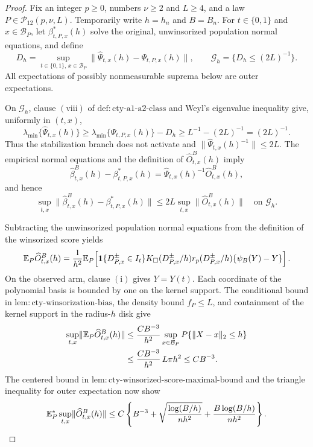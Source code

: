 \documentclass{article}
\begin{document}
\begin{proof}
Fix an integer \(p\geq0\), numbers \(\nu\geq2\) and \(L\geq4\), and a law \(P\in\mathcal P_{12}(p,\nu,L)\).  Temporarily write \(h=h_n\) and \(B=B_n\).  For \(t\in\{0,1\}\) and \(x\in\mathcal B_P\), let \(\beta^*_{t,P,x}(h)\) solve the original, unwinsorized population normal equations, and define
\[
 D_h=\sup_{t\in\{0,1\},\,x\in\mathcal B_P}
 \lVert\widehat\Psi_{t,x}(h)-\Psi_{t,P,x}(h)\rVert,
 \qquad
 \mathcal G_h=\{D_h\leq(2L)^{-1}\}.
\]
All expectations of possibly nonmeasurable suprema below are outer expectations.

On \(\mathcal G_h\), clause \(\mathrm{(viii)}\) of \(\mathrm{def:cty\text{-}a1\text{-}a2\text{-}class}\) and Weyl's eigenvalue inequality give, uniformly in \((t,x)\),
\[
 \lambda_{\min}\{\widehat\Psi_{t,x}(h)\}
 \geq \lambda_{\min}\{\Psi_{t,P,x}(h)\}-D_h
 \geq L^{-1}-(2L)^{-1}=(2L)^{-1}.
\]
Thus the stabilization branch does not activate and \(\lVert\widehat\Psi_{t,x}(h)^{-1}\rVert\leq2L\).  The empirical normal equations and the definition of \(\widehat O^B_{t,x}(h)\) imply
\[
 \widehat\beta^B_{t,x}(h)-\beta^*_{t,P,x}(h)
 =\widehat\Psi_{t,x}(h)^{-1}\widehat O^B_{t,x}(h),
\]
and hence
\[
 \sup_{t,x}\lVert\widehat\beta^B_{t,x}(h)-\beta^*_{t,P,x}(h)\rVert
 \leq 2L\sup_{t,x}\lVert\widehat O^B_{t,x}(h)\rVert
 \quad\text{on }\mathcal G_h.
\]

Subtracting the unwinsorized population normal equations from the definition of the winsorized score yields
\[
 \mathbb E_P\widehat O^B_{t,x}(h)
 ={1\over h^2}\mathbb E_P\!\left[
 \mathbf1\{D^{\pm}_{P,x}\in I_t\}K_\square(D^{\pm}_{P,x}/h)
 r_p(D^{\pm}_{P,x}/h)\{\psi_B(Y)-Y\}
 \right].
\]
On the observed arm, clause \(\mathrm{(i)}\) gives \(Y=Y(t)\).  Each coordinate of the polynomial basis is bounded by one on the kernel support.  The conditional bound in \(\mathrm{lem:cty\text{-}winsorization\text{-}bias}\), the density bound \(f_P\leq L\), and containment of the kernel support in the radius-\(h\) disk give
\[
\begin{split}
 \sup_{t,x}\lVert\mathbb E_P\widehat O^B_{t,x}(h)\rVert
 &\leq {CB^{-3}\over h^2}
 \sup_{x\in\mathcal B_P}P\{\lVert X-x\rVert_2\leq h\}\\
 &\leq {CB^{-3}\over h^2}\,L\pi h^2
 \leq CB^{-3}.
\end{split}
\]
The centered bound in \(\mathrm{lem:cty\text{-}winsorized\text{-}score\text{-}maximal\text{-}bound}\) and the triangle inequality for outer expectation now show
\[
 \mathbb E_P^*\sup_{t,x}\lVert\widehat O^B_{t,x}(h)\rVert
 \leq C\left\{B^{-3}+\sqrt{{\log(B/h)\over nh^2}}
 +{B\log(B/h)\over nh^2}\right\}.
\]


\end{proof}
\end{document}
